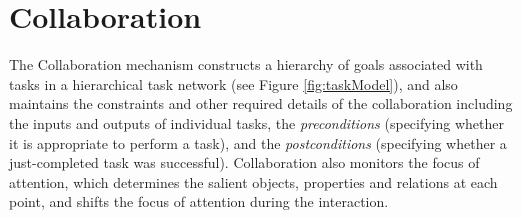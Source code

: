 \documentclass{sig-alternate-05-2015}
\begin{document}
% 
% 
% 
% 

\section{Collaboration}
The Collaboration mechanism constructs a hierarchy of goals associated with
tasks in a hierarchical task network (see Figure \ref{fig:taskModel}), and also
maintains the constraints and other required details of the collaboration
including the inputs and outputs of individual tasks, the \textit{preconditions}
(specifying whether it is appropriate to perform a task), and the
\textit{postconditions} (specifying whether a just-completed task was
successful). Collaboration also monitors the focus of attention, which
determines the salient objects, properties and relations at each point, and
shifts the focus of attention during the interaction.

\end{document}
